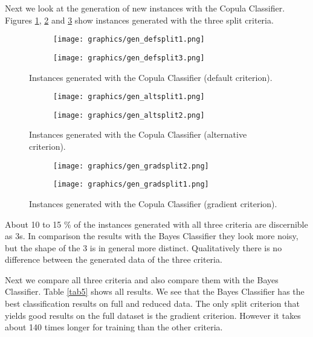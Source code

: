 \documentclass{article}
\begin{document}
Next we look at the generation of new instances with the Copula Classifier.
Figures \ref{fig3}, \ref{fig4} and \ref{fig5} show instances generated with the three
split criteria.

\begin{figure}[h]
	\centering
	\begin{subfigure}[b]{0.4\textwidth}
		\texttt{[image: graphics/gen\_defsplit1.png]}
	\end{subfigure}
	\begin{subfigure}[b]{0.4\textwidth}
		\texttt{[image: graphics/gen\_defsplit3.png]}
	\end{subfigure}
	\caption{Instances generated with the Copula Classifier (default criterion).}
	\label{fig3}
\end{figure}

\begin{figure}[h]
	\centering
	\begin{subfigure}[b]{0.4\textwidth}
		\texttt{[image: graphics/gen\_altsplit1.png]}
	\end{subfigure}
	\begin{subfigure}[b]{0.4\textwidth}
		\texttt{[image: graphics/gen\_altsplit2.png]}
	\end{subfigure}
	\caption{Instances generated with the Copula Classifier (alternative criterion).}
	\label{fig4}
\end{figure}

\begin{figure}[h]
	\centering
	\begin{subfigure}[b]{0.4\textwidth}
		\texttt{[image: graphics/gen\_gradsplit2.png]}
	\end{subfigure}
	\begin{subfigure}[b]{0.4\textwidth}
		\texttt{[image: graphics/gen\_gradsplit1.png]}
	\end{subfigure}
	\caption{Instances generated with the Copula Classifier (gradient criterion).}
	\label{fig5}
\end{figure}

\FloatBarrier

About 10 to 15 \% of the instances generated with all three criteria are discernible as 3s.
In comparison the results with the Bayes Classifier they look more noisy, but the shape of the 3 is 
in general more distinct. Qualitatively there is no difference between the generated data of the three criteria.

Next we compare all three criteria and also compare them with the Bayes Classifier.
Table \ref{tab5} shows all results. We see that the Bayes Classifier has the best classification
results on full and reduced data. The only split criterion that yields good results on the full dataset is
the gradient criterion. However it takes about 140 times longer for training than the other criteria.
\end{document}

